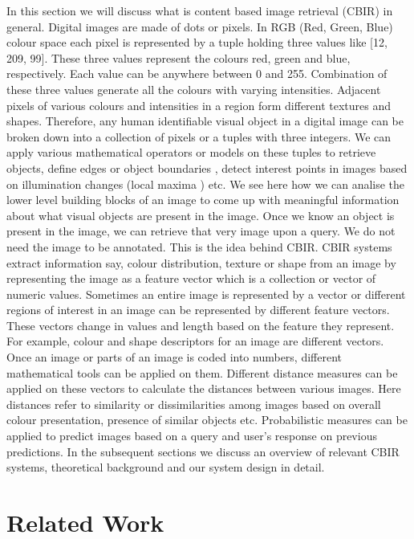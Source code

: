 \documentclass[english]{tktltiki}
\begin{document}
In this section we will discuss what is content based image retrieval (CBIR) in general. Digital images are made of dots or pixels. In  RGB (Red, Green, Blue) colour space each pixel is represented by a tuple holding three values like [12, 209, 99]. These three values represent the colours red, green and blue, respectively. Each value can be anywhere between 0 and 255. Combination of these three values generate all the colours with varying intensities. Adjacent pixels of various colours and intensities in a region form different textures and shapes. Therefore, any human identifiable visual object in a digital image can be broken down into a collection of pixels or a tuples with three integers. We can apply various mathematical operators or models on these tuples to retrieve objects, define edges or object boundaries \cite{canny}, detect interest points in images based on illumination changes (local maxima \cite{sift}) etc. We see here how we can analise the lower level building blocks of an image to come up with meaningful information about what visual objects are present in the image. Once we know an object is present in the image, we can retrieve that very image upon a query. We do not need the image to be annotated. This is the idea behind CBIR. CBIR systems extract information say, colour distribution, texture or shape from an image by representing the image as a feature vector which is a collection or vector of numeric values. Sometimes an entire image is represented by a vector or different regions of interest in an image can be represented by different feature vectors. These vectors change in values and length based on the feature they represent. For example, colour and shape descriptors for an image are different vectors. Once an image or parts of an image is coded into numbers, different mathematical tools can be applied on them. Different distance measures can be applied on these vectors to calculate the distances between various images. Here distances refer to similarity or dissimilarities among images based on overall colour presentation, presence of similar objects etc. Probabilistic measures can be applied to predict images based on a query and user's response on previous predictions. In the subsequent sections we discuss an overview of relevant CBIR systems, theoretical background and our system design in detail.

\section{Related Work}
\end{document}
